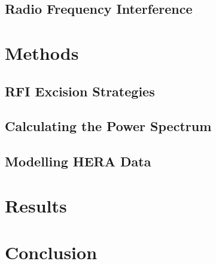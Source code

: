 \documentclass[12pt]{article}
\begin{document}
\subsection{Radio Frequency Interference} \label{subsec:rfi}

\section{Methods} \label{sec:methods}
\subsection{RFI Excision Strategies} \label{subsec:rfi_excision}
\subsection{Calculating the Power Spectrum} \label{subsec:calc_ps}
\subsection{Modelling HERA Data} \label{subsec:modelling}

\section{Results}

\section{Conclusion}



\end{document}
